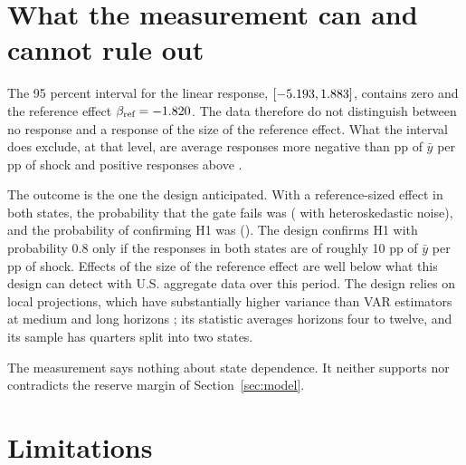 \documentclass[11pt]{article}
\theoremstyle{remark}
\begin{document}
\section{What the measurement can and cannot rule out}\label{sec:power}

The 95 percent interval for the linear response, $[-5.193, 1.883]$, contains zero and the reference effect
$\beta_{\text{ref}}=-1.820$. The data therefore do not distinguish between no response and a response of the size of the
reference effect. What the interval does exclude, at that level, are average responses more negative than \bLinCiLo{} pp of
$\bar y$ per pp of shock and positive responses above \bLinCiHi.

The outcome is the one the design anticipated. With a reference-sized effect in both states, the probability that the gate
fails was \PwHomoHzeroFalla{} (\PwHetHzeroFalla{} with heteroskedastic noise), and the probability of confirming H1 was
\PwHomoConfirma{} (\PwHetConfirma). The design confirms H1 with probability 0.8 only if the responses in both states are of roughly %
10 pp of $\bar y$ per pp of shock. Effects of the size of the reference effect are well below what this design can detect with
U.S. aggregate data over this period. The design relies on local projections, which have substantially higher variance than
VAR estimators at medium and long horizons \citep{LiPlagborgMollerWolf2024}; its statistic averages horizons four to twelve, and
its sample has \NShockFull{} quarters split into two states.

The measurement says nothing about state dependence. It neither supports nor contradicts the reserve margin of
Section~\ref{sec:model}.

\section{Limitations}\label{sec:limitations}
\end{document}
